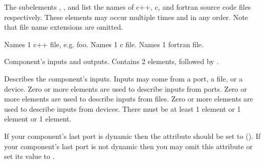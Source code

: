 \documentclass[11pt]{article}
\begin{document}
\begin{description}
\begin{description}
    The subelements , , and 
    list the names of c++, c, and fortran source code files respectively.
    These elements may occur multiple times and in any order.
    Note that file name extensions are omitted.
    \begin{description}
       Names 1 c++ file,
      e.g. foo. 
       Names 1 c file.
       Names 1 fortran file.
    \end{description}
     Component's inputs and
    outputs.  Contains 2 elements,  followed by
    .
    \begin{description}
       Describes the
      component's inputs. Inputs may 
      come from a port, a file, or a device.  Zero or more 
      elements are used to describe inputs from ports.  Zero or more
       elements are used to describe inputs from files.  Zero
      or more  elements are used to describe inputs from
      devices.  There must be at least 1  element or 1
       element or 1  element.

      If your component's last port is dynamic then the
       attribute should be set to 
      ().  If your component's last port
      is not dynamic then you may omit this attribute or set its value to
      .


\end{description}
\end{description}
\end{description}
\end{document}
